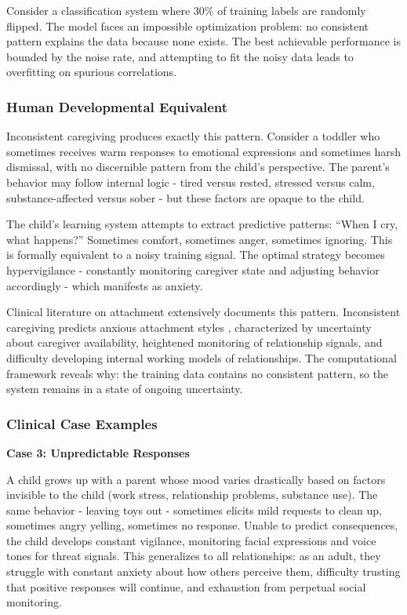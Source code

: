 \documentclass{article}
\begin{document}
Consider a classification system where 30\% of training labels are randomly flipped. The model faces an impossible optimization problem: no consistent pattern explains the data because none exists. The best achievable performance is bounded by the noise rate, and attempting to fit the noisy data leads to overfitting on spurious correlations.

\subsubsection{Human Developmental Equivalent}

Inconsistent caregiving produces exactly this pattern. Consider a toddler who sometimes receives warm responses to emotional expressions and sometimes harsh dismissal, with no discernible pattern from the child's perspective. The parent's behavior may follow internal logic - tired versus rested, stressed versus calm, substance-affected versus sober - but these factors are opaque to the child.

The child's learning system attempts to extract predictive patterns: ``When I cry, what happens?'' Sometimes comfort, sometimes anger, sometimes ignoring. This is formally equivalent to a noisy training signal. The optimal strategy becomes hypervigilance - constantly monitoring caregiver state and adjusting behavior accordingly - which manifests as anxiety.

Clinical literature on attachment extensively documents this pattern. Inconsistent caregiving predicts anxious attachment styles \cite{ainsworth1978}, characterized by uncertainty about caregiver availability, heightened monitoring of relationship signals, and difficulty developing internal working models of relationships. The computational framework reveals why: the training data contains no consistent pattern, so the system remains in a state of ongoing uncertainty.

\subsubsection{Clinical Case Examples}

\textbf{Case 3: Unpredictable Responses}

A child grows up with a parent whose mood varies drastically based on factors invisible to the child (work stress, relationship problems, substance use). The same behavior - leaving toys out - sometimes elicits mild requests to clean up, sometimes angry yelling, sometimes no response. Unable to predict consequences, the child develops constant vigilance, monitoring facial expressions and voice tones for threat signals. This generalizes to all relationships: as an adult, they struggle with constant anxiety about how others perceive them, difficulty trusting that positive responses will continue, and exhaustion from perpetual social monitoring.
\end{document}
